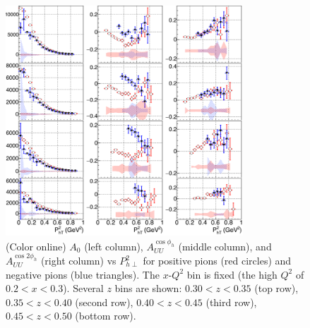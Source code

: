 \documentclass[aps,prl,twocolumn,showpacs,superscriptaddress,groupedaddress]{revtex4-1}  %
\begin{document}
\begin{figure}[htp]
\centering
\includegraphics[width=3.5in]{plots/A0AcAcc_zPT2bins_x1QQ1_final.png}
\caption{(Color online) $A_0$ (left column), $A_{UU}^{\cos\phi_h}$ (middle column), and $A_{UU}^{\cos 2\phi_h}$ (right column) vs $P_{h\perp}^2$ for positive pions (red circles) and negative pions (blue triangles). The $x$-$Q^2$ bin is fixed (the high $Q^2$ of $0.2 < x < 0.3$). Several $z$ bins are shown: $0.30 < z < 0.35$ (top row), $0.35 < z < 0.40$ (second row), $0.40 < z < 0.45$ (third row), $0.45 < z < 0.50$ (bottom row).}
\label{fig:A0AcAcc_zPT2bins_x1QQ1_final}
\end{figure}
%
%
\end{document}
